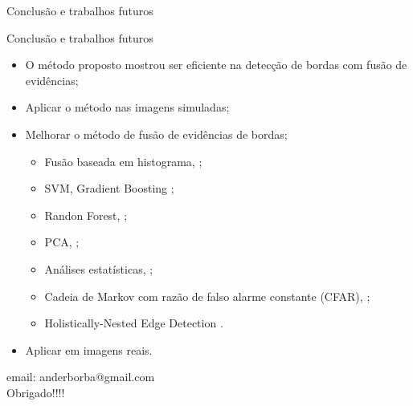 \documentclass[10pt]{beamer}
\begin{document}
\begin{frame}{Conclusão e trabalhos futuros}
\begin{alertblock}{Conclusão e trabalhos futuros}
\begin{itemize}
\item O método proposto mostrou ser eficiente na detecção de bordas com fusão de evidências;
\item Aplicar o método nas imagens simuladas;
\item Melhorar o método de fusão de evidências de bordas;
	\begin{itemize}
    \item Fusão baseada em histograma, \cite{fbgm};
	\item SVM, Gradient Boosting \cite{ggvlsw};
	\item Randon Forest, \cite{sglmla};
	\item PCA, \cite{mit};
	\item Análises estatísticas, \cite{gs};
	\item Cadeia de Markov com razão de falso alarme constante (CFAR), \cite{flla};
	\item Holistically-Nested Edge Detection \cite{xstz}.
	\end{itemize}
\item Aplicar em imagens reais.
\end{itemize}
\end{alertblock}
\end{frame}

\begin{frame}[standout]
  email: anderborba@gmail.com\\
  Obrigado!!!!
\end{frame}
\begin{frame}[allowframebreaks]
%

\tiny 
\end{frame}
\end{document}
